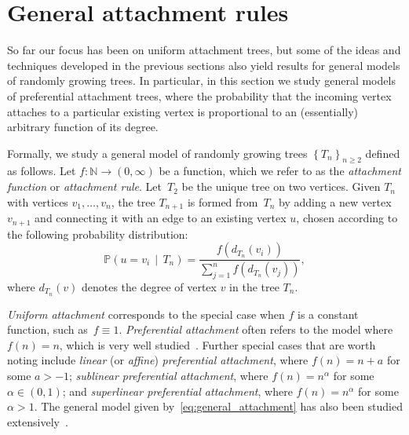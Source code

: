 \documentclass[11pt]{article}
\numberwithin{equation}{section}
\newcommand{\p}{\mathbb{P}} %
\theoremstyle{definition}
\begin{document}
\section{General attachment rules} \label{sec:general} %


So far our focus has been on uniform attachment trees, but some of the ideas and techniques developed in the previous sections also yield results for general models of randomly growing trees. 
In particular, in this section we study general models of preferential attachment trees, where the probability that the incoming vertex attaches to a particular existing vertex is proportional to an (essentially) arbitrary function of its degree. 

Formally, we study a general model of randomly growing trees $\left\{ T_{n} \right\}_{n \geq 2}$ defined as follows. Let $f : \mathbb{N} \to (0,\infty)$ be a function, which we refer to as the \emph{attachment function} or \emph{attachment rule}. Let~$T_{2}$ be the unique tree on two vertices. Given $T_{n}$ with vertices $v_{1}, \ldots, v_{n}$, the tree $T_{n+1}$ is formed from~$T_{n}$ by adding a new vertex $v_{n+1}$ and connecting it with an edge to an existing vertex $u$, chosen according to the following probability distribution: 
\begin{equation}\label{eq:general_attachment}
\p \left( u = v_{i} \, \middle| \, T_{n} \right) 
= \frac{f(d_{T_{n}}(v_{i}))}{\sum_{j=1}^{n} f(d_{T_{n}}(v_{j}))},
\end{equation}
where $d_{T_{n}}(v)$ denotes the degree of vertex $v$ in the tree $T_{n}$. 

\emph{Uniform attachment} corresponds to the special case when $f$ is a constant function, such as~$f \equiv 1$. 
\emph{Preferential attachment} often refers to the model where $f(n) = n$, which is very well studied~\cite{Mah92,BA99,BRST01}. 
Further special cases that are worth noting include 
\emph{linear} (or \emph{affine}) \emph{preferential attachment}, where $f(n) = n + a$ for some $a > -1$; 
\emph{sublinear preferential attachment}, where $f(n) = n^{\alpha}$ for some $\alpha \in (0,1)$; 
and \emph{superlinear preferential attachment}, where $f(n) = n^{\alpha}$ for some $\alpha > 1$. 
The general model given by~\eqref{eq:general_attachment} has also been studied extensively~\cite{RTV07}. 
\end{document}
